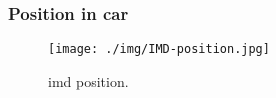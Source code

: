 \subsubsection{Position in car}

\begin{figure}[H]
	\centering
	\texttt{[image: ./img/IMD-position.jpg]}
	\caption{\gls{imd} position.}
	\label{fig:IMD-position}
\end{figure}
